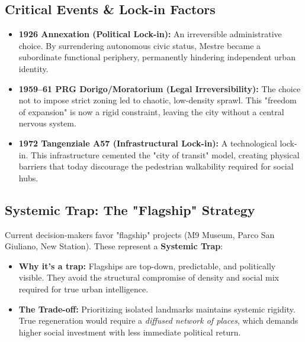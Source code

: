 \documentclass[a4paper,11pt]{article}
\begin{document}
\subsection*{Critical Events \& Lock-in Factors}
\begin{itemize}
    \item \textbf{1926 Annexation (Political Lock-in):} An irreversible administrative choice. By surrendering autonomous civic status, Mestre became a subordinate functional periphery, permanently hindering independent urban identity.
    \item \textbf{1959–61 PRG Dorigo/Moratorium (Legal Irreversibility):} The choice not to impose strict zoning led to chaotic, low-density sprawl. This "freedom of expansion" is now a rigid constraint, leaving the city without a central nervous system.
    \item \textbf{1972 Tangenziale A57 (Infrastructural Lock-in):} A technological lock-in. This infrastructure cemented the "city of transit" model, creating physical barriers that today discourage the pedestrian walkability required for social hubs.
\end{itemize}

\subsection*{Systemic Trap: The "Flagship" Strategy}
Current decision-makers favor "flagship" projects (M9 Museum, Parco San Giuliano, New Station). These represent a \textbf{Systemic Trap}:
\begin{itemize}
    \item \textbf{Why it's a trap:} Flagships are top-down, predictable, and politically visible. They avoid the structural compromise of density and social mix required for true urban intelligence.
    \item \textbf{The Trade-off:} Prioritizing isolated landmarks maintains systemic rigidity. True regeneration would require a \textit{diffused network of places}, which demands higher social investment with less immediate political return.
\end{itemize}
\end{document}
